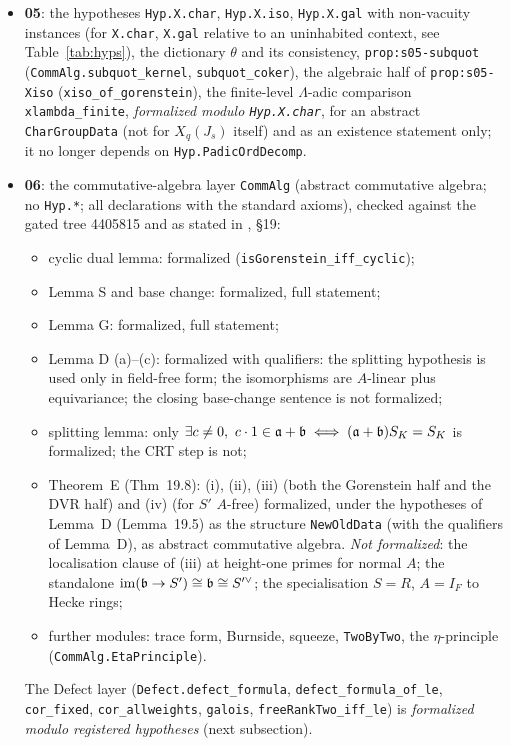 \begin{itemize}
  $A$-transitions is an argument and is not formalized), Hecke operators with coefficients.
\item \textbf{05}: the hypotheses \texttt{Hyp.X.char}, \texttt{Hyp.X.iso}, \texttt{Hyp.X.gal} with non-vacuity instances (for \texttt{X.char}, \texttt{X.gal} relative to an uninhabited
  context, see Table~\ref{tab:hyps}), the
  dictionary $\theta$ and its consistency, \texttt{prop:s05-subquot} (\texttt{CommAlg.subquot\_kernel},
  \texttt{subquot\_coker}), the algebraic half of \texttt{prop:s05-Xiso} (\texttt{xiso\_of\_gorenstein}), the finite-level
  $\Lambda$-adic comparison \texttt{xlambda\_finite}, \emph{formalized modulo \texttt{Hyp.X.char}}, for an abstract
  \texttt{CharGroupData} (not for $X_q(J_s)$ itself) and as an existence statement only; it no longer depends on
  \texttt{Hyp.PadicOrdDecomp}.
\item \textbf{06}: the commutative-algebra layer \texttt{CommAlg} (abstract commutative algebra; no \texttt{Hyp.*}; all
  declarations with the standard axioms), checked against the gated tree 4405815 and as stated in \mainpdf, \S19:
  \begin{itemize}
  \item cyclic dual lemma: formalized (\texttt{isGorenstein\_iff\_cyclic});
  \item Lemma S and base change: formalized, full statement;
  \item Lemma G: formalized, full statement;
  \item Lemma D (a)--(c): formalized with qualifiers: the splitting hypothesis is used only in field-free form; the
    isomorphisms are $A$-linear plus equivariance; the closing base-change sentence is not formalized;
  \item splitting lemma: only $\exists c\ne0,\ c\cdot1\in\fa+\fb\iff(\fa+\fb)S_K=S_K$ is formalized; the CRT step is not;
  \item Theorem~E (Thm~19.8): (i), (ii), (iii) (both the Gorenstein half and the DVR half) and (iv) (for $S'$ $A$-free) formalized, under the hypotheses of Lemma~D (Lemma~19.5) as the structure \texttt{NewOldData} (with the qualifiers of Lemma~D), as abstract
    commutative algebra. \emph{Not formalized}: the localisation clause of (iii) at height-one primes for normal $A$; the
    standalone $\operatorname{im}(\mathfrak{b}\to S')\cong\mathfrak{b}\cong S'^\vee$; the specialisation $S=R$, $A=I_F$ to Hecke rings;
  \item further modules: trace form, Burnside, squeeze, \texttt{TwoByTwo}, the $\eta$-principle (\texttt{CommAlg.EtaPrinciple}).
  \end{itemize}
  The Defect layer (\texttt{Defect.defect\_formula}, \texttt{defect\_formula\_of\_le}, \texttt{cor\_fixed},
  \texttt{cor\_allweights}, \texttt{galois}, \texttt{freeRankTwo\_iff\_le}) is \emph{formalized modulo registered
  hypotheses} (next subsection).
\end{itemize}

